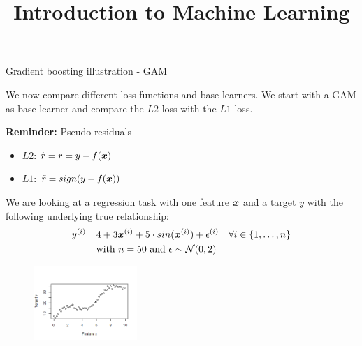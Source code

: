  






\newcommand{\titlefigure}{figure_man/illustration_tdist_L2_2.png}
\newcommand{\learninggoals}{
  \item \textcolor{blue}{XXX}
  \item \textcolor{blue}{XXX}
}

\title{Introduction to Machine Learning}
\date{}






\begin{vbframe}{Gradient boosting illustration - GAM}

We now compare different loss functions and base learners.
We start with a GAM as base learner and compare the $L2$ loss with
the $L1$ loss.\\
\vspace*{0.1cm}

\textbf{Reminder:} Pseudo-residuals
\begin{itemize}
\item $L2$: $\tilde{r} = r = y - f(\bm{x})$
\item $L1$: $\tilde{r} = sign(y - f(\bm{x}))$
\end{itemize}
We are looking at a regression task with one feature $\bm{x}$ and a target $y$ with the following
underlying true relationship:
\vspace{-0.2cm}
\begin{align*}
y^{(i)} = & 4 + 3\bm{x}^{(i)} + 5 \cdot sin(\bm{x}^{(i)}) + \epsilon^{(i)} \quad \forall i \in \{1, \ldots, n\}\\
&\text{with } n = 50 \text{ and } \epsilon \sim \mathcal{N}(0,2)
\end{align*}

\vspace{-0.3cm}
\begin{figure}
  \includegraphics[width=0.35\textwidth]{figure_man/illustration_data_normal.png}
\end{figure}


\end{vbframe}
